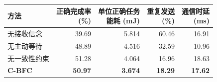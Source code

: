 \begin{table}[t]
  \centering\small
  \setlength{\tabcolsep}{3.5pt}
  \label{rq3:tab:ablation-results}
  \begin{tabular*}{\linewidth}{@{\extracolsep{\fill}}lrrrr@{}}
    \toprule
    方法 & \shortstack{正确完成率\\(\%)} & \shortstack{单位正确任务\\能耗 (mJ)} & \shortstack{重复发送\\(\%)} & \shortstack{通信时延\\(ms)}\\
    \midrule
    无接收信念 & 39.69 & 5.814 & 60.46 & 16.91\\
    无主动等待 & 48.89 & 4.516 & 32.59 & 10.96\\
    无一致性约束 & 51.28 & 4.064 & 16.96 & 18.63\\
    \midrule
    \textbf{C-BFC} & \textbf{50.97} & \textbf{3.674} & \textbf{18.29} & \textbf{17.62}\\
    \bottomrule
  \end{tabular*}
  \par\vspace{4pt}{\footnotesize 各版本分别完成验证参数选择；表中数值为五个反馈丢失条件的等权平均。}
\end{table}
